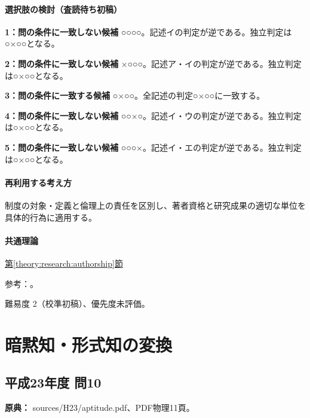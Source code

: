 \paragraph{選択肢の検討（査読待ち初稿）}\mbox{}\par

\noindent\textbf{1：問の条件に一致しない候補} ○○○○。記述イの判定が逆である。独立判定は○×○○となる。\par

\noindent\textbf{2：問の条件に一致しない候補} ×○○○。記述ア・イの判定が逆である。独立判定は○×○○となる。\par

\noindent\textbf{3：問の条件に一致する候補} ○×○○。全記述の判定○×○○に一致する。\par

\noindent\textbf{4：問の条件に一致しない候補} ○○×○。記述イ・ウの判定が逆である。独立判定は○×○○となる。\par

\noindent\textbf{5：問の条件に一致しない候補} ○○○×。記述イ・エの判定が逆である。独立判定は○×○○となる。\par

\paragraph{再利用する考え方} 制度の対象・定義と倫理上の責任を区別し、著者資格と研究成果の適切な単位を具体的行為に適用する。

\paragraph{共通理論} \hyperref[theory:research:authorship]{第\ref*{theory:research:authorship}節}

\par 参考：\cite{jsps_integrity2025}。

\par 難易度 2（校準初稿）、優先度未評価。

\section{暗黙知・形式知の変換}

\subsection{平成23年度 問10}
\label{q:h23-reg-apt-10}

\noindent\textbf{原典：} sources/H23/aptitude.pdf、PDF物理11頁。

